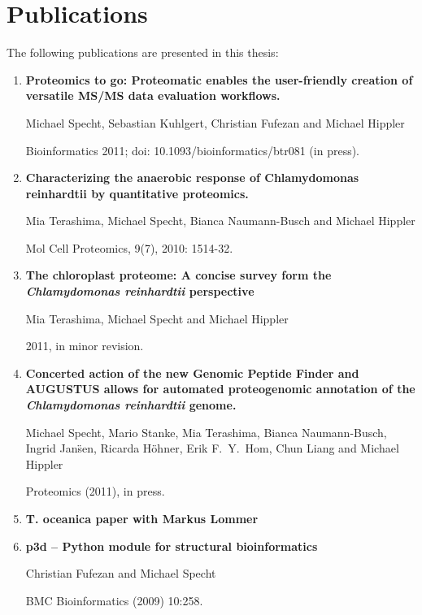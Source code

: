 \chapter{Publications}

The following publications are presented in this thesis:

\begin{enumerate}
\item 
{\bf Proteomics to go: Proteomatic enables the user-friendly creation of versatile MS/MS data evaluation workflows.}

Michael Specht, Sebastian Kuhlgert, Christian Fufezan and Michael Hippler

Bioinformatics 2011; doi: 10.1093/bioinformatics/btr081 (in press).

\item
{\bf Characterizing the anaerobic response of Chlamydomonas reinhardtii by quantitative proteomics.}

Mia Terashima, Michael Specht, Bianca Naumann-Busch and Michael Hippler

Mol Cell Proteomics, 9(7), 2010: 1514-32.

\item
{\bf The chloroplast proteome: A concise survey form the {\em Chlamydomonas reinhardtii} perspective}

Mia Terashima, Michael Specht and Michael Hippler

2011, in minor revision.

\item
{\bf Concerted action of the new Genomic Peptide Finder and AUGUSTUS allows for automated proteogenomic annotation of the {\em Chlamydomonas reinhardtii} genome.}

Michael Specht, Mario Stanke, Mia Terashima, Bianca Naumann-Busch, Ingrid Jan\"sen, Ricarda H\"ohner, Erik F.~Y.~Hom, Chun Liang and Michael Hippler

Proteomics (2011), in press.

\item
{\bf T. oceanica paper with Markus Lommer}

\item
{\bf p3d -- Python module for structural bioinformatics}

Christian Fufezan and Michael Specht

BMC Bioinformatics (2009) 10:258.

\end{enumerate}

